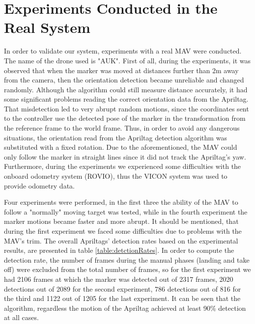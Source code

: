  
\section{Experiments Conducted in the Real System}
\label{sec:realExperiments}

In order to validate our system, experiments with a real MAV were conducted. The name of the drone used is "AUK". First of all, during the experiments, it was observed that when the marker was moved at distances further than 2m away from the camera, then the orientation detection became unreliable and changed randomly. Although the algorithm could still measure distance accurately, it had some significant problems reading the correct orientation data from the Apriltag. That misdetection led to very abrupt random motions, since the coordinates sent to the controller use the detected pose of the marker in the transformation from the reference frame to the world frame. Thus, in order to avoid any dangerous situations, the orientation read from the Apriltag detection algorithm was substituted with a fixed rotation. Due to the aforementioned, the MAV could only follow the marker in straight lines since it did not track the Apriltag's yaw. Furthermore, during the experiments we experienced some difficulties with the onboard odometry system (ROVIO\protect\footnotemark), thus the VICON system was used to provide odometry data.


Four experiments were performed, in the first three the ability of the MAV to follow a "normally" moving target was tested, while in the fourth experiment the marker motions became faster and more abrupt. It should be mentioned, that during the first experiment we faced some difficulties due to problems with the MAV's trim. The overall Apriltags' detection rates based on the experimental results, are presented in table \ref{table:detctionRates}. In order to compute the detection rate, the number of frames during the manual phases (landing and take off) were excluded from the total number of frames, so for the first experiment we had 2106 frames at which the marker was detected out of 2317 frames, 2020 detections out of 2089 for the second experiment, 786 detections out of 816 for the third and 1122 out of 1205 for the last experiment. It can be seen that the algorithm, regardless the motion of the Apriltag achieved at least 90\% detection at all cases.

